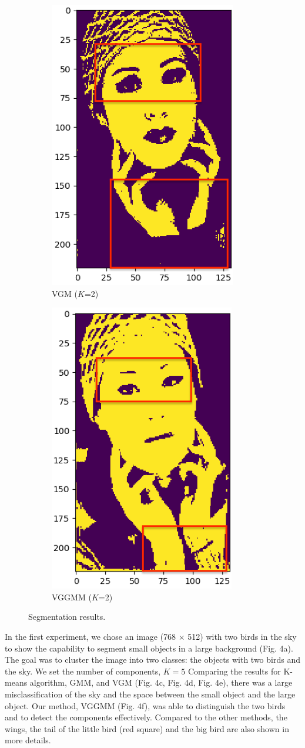 \documentclass[conference]{IEEEtran}
\begin{document}
\begin{figure}
    \centering
    \begin{subfigure}{.5\linewidth}
        \centering
        \includegraphics[height=0.7\textwidth]{imgresults/face_vgm.png}
        \caption{VGM ($K$=2)}
        \label{fig:sub1}
    \end{subfigure}%
    \begin{subfigure}{.5\linewidth}
        \centering
        \includegraphics[height=0.7\textwidth]{imgresults/face_vggmm.png}
        \caption{VGGMM ($K$=2)}
        \label{fig:sub2}
    \end{subfigure}
    \caption{Segmentation results.}
    \label{fig:crow}
\end{figure}
In the first experiment, we chose an image (768 × 512) with two birds in the sky to show the capability to segment small objects in a large background (Fig. 4a). 
The goal was to cluster the image into two classes: the objects with two birds and the sky. 
We set the number of components, $K= 5$
Comparing the results for K-means algorithm, GMM, and VGM (Fig. 4c, Fig. 4d, Fig. 4e), there was a large misclassification of the sky and the space between the small object and the large object.
Our method, VGGMM (Fig. 4f), was able to distinguish the two birds and to detect the components effectively. Compared to the other methods, the wings, the tail of the little bird (red square) and the big bird are also shown in more details. 
\end{document}
